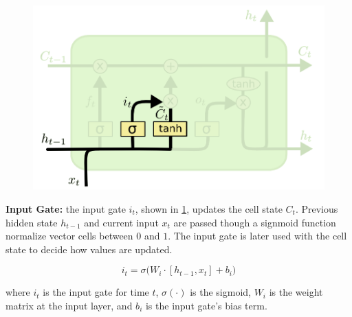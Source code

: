 \begin{program}
\begin{figure}
\begin{center}
    \vspace{-30pt}
    \includegraphics[width=0.9\linewidth]{imgs/lstm_inputGate.png}
\end{center}
\label{fig:inputGate}
\end{figure}

\ContentFontSize

\textbf{Input Gate: } the input gate $i_t$, shown in \cref{fig:inputGate}, updates the cell state $C_t$. Previous hidden state $h_{t-1}$ and current input $x_t$ are passed though a signmoid function normalize vector cells between $0$ and $1$. The input gate is later used with the cell state to decide how values are updated. 

\begin{equation}
i_t = \sigma \Big( W_i \cdot [h_{t-1}, x_t] + b_i \Big)
\end{equation}

where $i_t$ is the input gate for time $t$, $\sigma(\cdot)$ is the sigmoid, $W_i$ is the weight matrix at the input layer, and $b_i$ is the input gate's bias term. \par \kern 5pt
\end{program}





